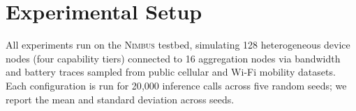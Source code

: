 \section{Experimental Setup}

All experiments run on the \textsc{Nimbus} testbed, simulating 128 heterogeneous device nodes (four capability tiers) connected to 16 aggregation nodes via bandwidth and battery traces sampled from public cellular and Wi-Fi mobility datasets. Each configuration is run for 20{,}000 inference calls across five random seeds; we report the mean and standard deviation across seeds.
